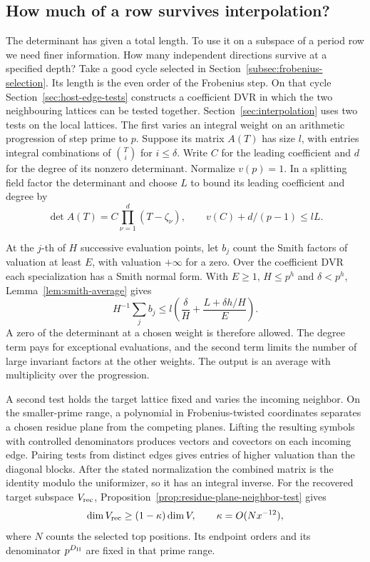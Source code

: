 \subsection{How much of a row survives interpolation?}

The determinant has given a total length. To use it on a subspace of a period row we
need finer information. How many independent directions survive at a specified depth? Take a good cycle selected in Section~\ref{subsec:frobenius-selection}.
Its length is the even order of the Frobenius step. On that cycle
Section~\ref{sec:host-edge-tests} constructs a coefficient DVR in which
the two neighbouring lattices can be tested together. Section~\ref{sec:interpolation} uses two tests on the local lattices. The first varies an integral weight on an arithmetic progression of step prime to \(p\). Suppose its matrix \(A(T)\) has size \(l\), with entries integral combinations of \(\binom{T}{i}\) for \(i\le\delta\). Write \(C\) for the leading coefficient and \(d\) for the degree of its nonzero determinant. Normalize \(v(p)=1\). In a splitting field factor the determinant
and choose \(L\) to bound its leading coefficient and degree by
\[
             \det A(T)=C\prod_{\nu=1}^d(T-\zeta_\nu),
             \qquad v(C)+d/(p-1)\le lL .
\]

At the \(j\)-th of \(H\) successive evaluation points, let \(b_j\) count the Smith factors of valuation at least \(E\), with valuation \(+\infty\) for a zero. Over the coefficient DVR each specialization has a Smith normal form.
With \(E\ge1\), \(H\le p^h\) and \(\delta<p^h\),
Lemma~\ref{lem:smith-average} gives
\[
             H^{-1}\sum_j b_j
               \le l\left(\frac{\delta}{H}+
                           \frac{L+\delta h/H}{E}\right).
\]
A zero of the determinant at a chosen weight is therefore allowed. The degree term pays for exceptional evaluations, and the second term limits the number of large invariant factors at the other weights. The output is an average with multiplicity over the progression.

A second test holds the target lattice fixed and varies the incoming neighbor. On the smaller-prime range, a polynomial in Frobenius-twisted coordinates separates a chosen residue plane from the competing planes. Lifting the resulting symbols with controlled denominators produces vectors and covectors on each incoming edge. Pairing tests from distinct edges gives entries of higher valuation than the diagonal blocks. After the stated normalization the combined matrix is the identity modulo the uniformizer, so it has an integral inverse. For the recovered target subspace \(V_{\rm rec}\), Proposition~\ref{prop:residue-plane-neighbor-test} gives
\[
                 \dim V_{\rm rec}\ge(1-\kappa)\dim V,
                          \qquad \kappa=O(Nx^{-12}),
\]
where \(N\) counts the selected top positions. Its endpoint orders and its denominator \(p^{D_{\rm II}}\) are fixed in that prime range.

